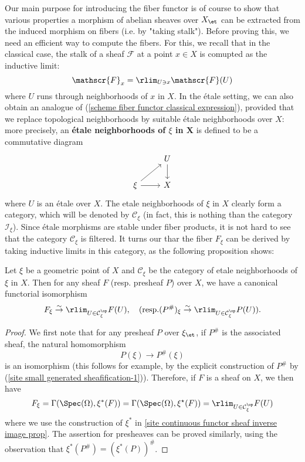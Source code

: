 Our main purpose for introducing the fiber functor is of course to show that various properties a morphism of abelian sheaves over $X_\et$ can be extracted from the induced morphism on fibers (i.e. by "taking stalk"). Before proving this, we need an efficient way to compute the fibers. For this, we recall that in the classical case, the stalk of a sheaf $\mathscr{F}$ at a point $x\in X$ is comupted as the inductive limit:
\begin{equation}\label{scheme fiber functor classical expression}
\mathscr{F}_x=\rlim_{U\ni x}\mathscr{F}(U)
\end{equation}
where $U$ runs through neighborhoods of $x$ in $X$. In the \'etale setting, we can also obtain an analogue of (\ref{scheme fiber functor classical expression}), provided that we replace topological neighborhoods by suitable \'etale neighborhoods over $X$: more precisely, an \textbf{\'etale neighborhoods of $\xi$ in $\bm{X}$} is defined to be a commutative diagram
\[\begin{tikzcd}
&U\ar[d]\\
\xi\ar[ru]\ar[r]&X
\end{tikzcd}\]
where $U$ is an \'etale over $X$. The etale neighborhoods of $\xi$ in $X$ clearly form a category, which will be denoted by $\mathcal{C}_\xi$ (in fact, this is nothing than the category $\mathcal{I}_\xi$). Since \'etale morphisms are stable under fiber products, it is not hard to see that the category $\mathcal{C}_\xi$ is filtered. It turns our thar the fiber $F_\xi$ can be derived by taking inductive limits in this category, as the following proposition shows:
\begin{proposition}\label{scheme etale site fiber functor expression}
Let $\xi$ be a geometric point of $X$ and $\mathcal{C}_\xi$ be the category of etale neighborhoods of $\xi$ in $X$. Then for any sheaf $F$ (resp. presheaf $P$) over $X$, we have a canonical functorial isomorphism
\begin{equation}\label{scheme etale site fiber functor expression-1}
F_\xi \stackrel{\sim}{\to} \rlim_{U\in\mathcal{C}_\xi^{\op}} F(U),\quad 
(\text{resp.}(P^\#)_\xi \stackrel{\sim}{\to} \rlim_{U\in\mathcal{C}_\xi^{\op}} P(U)).
\end{equation}
\end{proposition}
\begin{proof}
We first note that for any presheaf $P$ over $\xi_\et$, if $P^\#$ is the associated sheaf, the natural homomorphism
\[P(\xi)\to P^\#(\xi)\]
is an isomorphism (this follows for example, by the explicit construction of $P^\#$ by (\ref{site small generated sheafification-1})). Therefore, if $F$ is a sheaf on $X$, we then have
\[F_\xi=\Gamma(\Spec(\Omega),\xi^*(F))=\Gamma(\Spec(\Omega),\xi^\star(F))=\rlim_{U\in\mathcal{C}_\xi^{\op}}F(U)\]
where we use the construction of $\xi^*$ in \cref{site continuous functor sheaf inverse image prop}. The assertion for presheaves can be proved similarly, using the observation that $\xi^*(P^\#)=(\xi^*(P))^\#$.
\end{proof}

